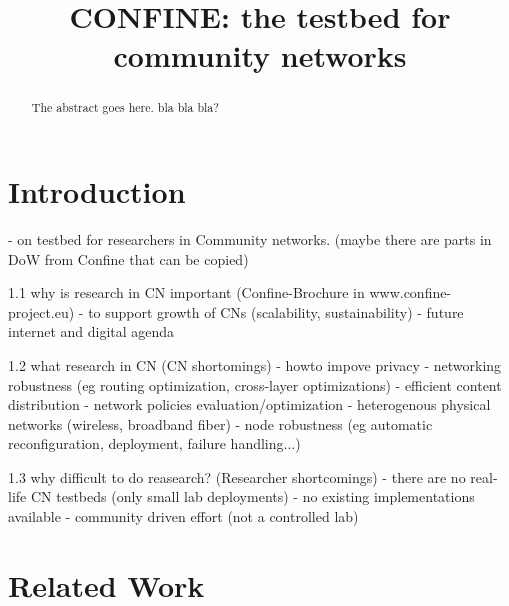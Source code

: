 \documentclass[conference]{IEEEtran}
\begin{document}
\title{CONFINE: the testbed for community networks}


\author{
\and
{}
}

\maketitle


\begin{abstract}
The abstract goes here. bla bla bla?
\end{abstract}

\section{Introduction}

- on testbed for researchers in Community networks.
(maybe there are parts in DoW from Confine that can be copied)

1.1 why is research in CN important (Confine-Brochure in www.confine-project.eu)
  - to support growth of CNs (scalability, sustainability)
  - future internet and digital agenda

1.2 what research in CN (CN shortomings)
  - howto impove privacy
  - networking robustness (eg routing optimization, cross-layer optimizations)
  - efficient content distribution
  - network policies evaluation/optimization
  - heterogenous physical networks (wireless, broadband fiber)
  - node robustness (eg automatic reconfiguration, deployment, failure handling...)

1.3 why difficult to do reasearch? (Researcher shortcomings)
   - there are no real-life CN testbeds (only small lab deployments)
   - no existing implementations available
   - community driven effort (not a controlled lab)

\section{Related Work}
\end{document}

